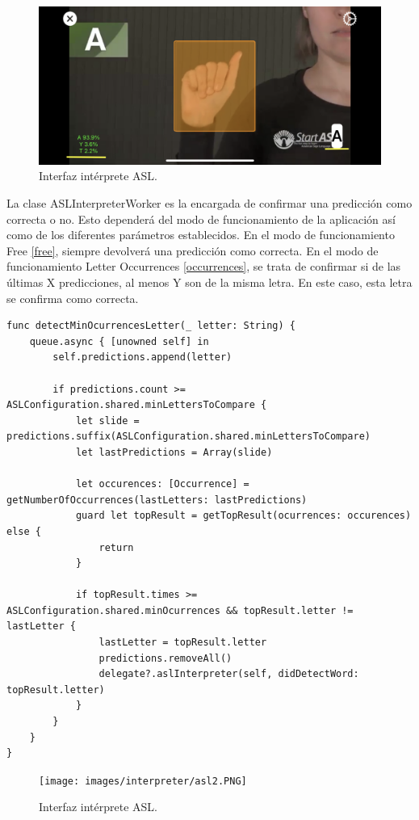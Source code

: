 \documentclass[../main.tex]{subfiles}
\begin{document}
\begin{figure}[h]
\centering 
\includegraphics[width=1\textwidth]{images/interpreter/asl1.PNG}
\caption{Interfaz intérprete ASL.}
\label{figure23}
\end{figure}

La clase ASLInterpreterWorker es la encargada de confirmar una predicción como correcta o no. Esto dependerá del modo de funcionamiento de la aplicación así como de los diferentes parámetros establecidos. En el modo de funcionamiento Free \ref{free}, siempre devolverá una predicción como correcta. En el modo de funcionamiento Letter Occurrences \ref{occurrences}, se trata de confirmar si de las últimas X predicciones, al menos Y son de la misma letra. En este caso, esta letra se confirma como correcta.
\begin{lstlisting}[style=swift]
func detectMinOcurrencesLetter(_ letter: String) {
    queue.async { [unowned self] in
        self.predictions.append(letter)
        
        if predictions.count >= ASLConfiguration.shared.minLettersToCompare {
            let slide = predictions.suffix(ASLConfiguration.shared.minLettersToCompare)
            let lastPredictions = Array(slide)
            
            let occurences: [Occurrence] = getNumberOfOccurrences(lastLetters: lastPredictions)
            guard let topResult = getTopResult(ocurrences: occurences) else {
                return
            }
            
            if topResult.times >= ASLConfiguration.shared.minOcurrences && topResult.letter != lastLetter {
                lastLetter = topResult.letter
                predictions.removeAll()
                delegate?.aslInterpreter(self, didDetectWord: topResult.letter)
            }
        }
    }
}
\end{lstlisting}    

\begin{figure}[h]
\centering 
\texttt{[image: images/interpreter/asl2.PNG]}
\caption{Interfaz intérprete ASL.}
\label{figure24}
\end{figure}
\end{document}
